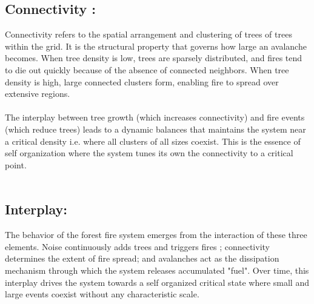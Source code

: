 \documentclass{article}
\begin{document}
\subsection{ Connectivity :}
Connectivity refers to the spatial arrangement and clustering of trees of trees within the grid. It is the structural property that governs how large an avalanche becomes. When tree density is low, trees are sparsely distributed, and fires tend to die out quickly because of the absence of connected neighbors. When tree density is high, large connected clusters form, enabling fire to spread over extensive regions.\\
\\
The interplay between tree growth (which increases connectivity) and fire events (which reduce trees) leads to a dynamic balances that maintains the system near a critical density i.e. where all clusters of all sizes coexist. This is the essence of self organization where the system tunes its own the connectivity to a critical point.\\
\\
\subsection{Interplay:} 
The behavior of the forest fire system emerges from the interaction of these three elements. Noise continuously adds trees and triggers fires ; connectivity determines the extent of fire spread; and avalanches act as the dissipation mechanism through which the system releases accumulated "fuel". Over time, this interplay drives  the system towards a self organized critical state where small and large events coexist without any characteristic scale.\\
\\
\end{document}
